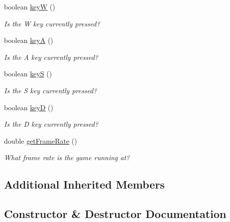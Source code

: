 \begin{DoxyCompactItemize}
boolean \mbox{\hyperlink{classbridges_1_1games_1_1_non_blocking_game_a45db18869044968a233a6f217650e34d}{keyW}} ()
\begin{DoxyCompactList}\small\item\em Is the W key currently pressed? \end{DoxyCompactList}\item 
boolean \mbox{\hyperlink{classbridges_1_1games_1_1_non_blocking_game_a4328a21ca65c26e11161dfe362770917}{keyA}} ()
\begin{DoxyCompactList}\small\item\em Is the A key currently pressed? \end{DoxyCompactList}\item 
boolean \mbox{\hyperlink{classbridges_1_1games_1_1_non_blocking_game_a4beb82246ef1eaf8c13aa406632ab936}{keyS}} ()
\begin{DoxyCompactList}\small\item\em Is the S key currently pressed? \end{DoxyCompactList}\item 
boolean \mbox{\hyperlink{classbridges_1_1games_1_1_non_blocking_game_a830a2e8127b042f8915deb61f0038f2a}{keyD}} ()
\begin{DoxyCompactList}\small\item\em Is the D key currently pressed? \end{DoxyCompactList}\item 
double \mbox{\hyperlink{classbridges_1_1games_1_1_non_blocking_game_a28e91d62c0261acb7b1b0c12a9905275}{get\+Frame\+Rate}} ()
\begin{DoxyCompactList}\small\item\em What frame rate is the game running at? \end{DoxyCompactList}\end{DoxyCompactItemize}
\subsection*{Additional Inherited Members}


\subsection{Constructor \& Destructor Documentation}
\mbox{\label{classbridges_1_1games_1_1_non_blocking_game_ae85ea8dcc355372ba354f4e26323fb76}} 
